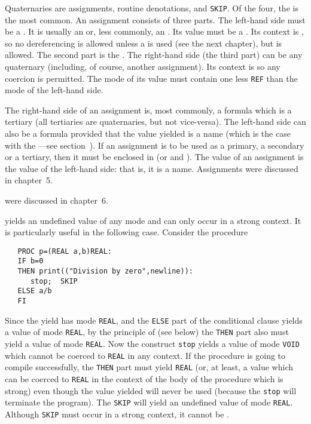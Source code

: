 Quaternaries are assignments, routine denotations,
 and \verb|SKIP|. Of the
four, the  is the most common.  An assignment consists
of three parts. The left-hand side must be a . It is
usually an  or, less commonly, an
. Its value must be a .
Its context is , so no dereferencing is
allowed unless a  is used (see the next chapter), but
 is allowed.  The second
part is the .  The right-hand side (the third
part) can be any quaternary (including, of course, another
assignment). Its context is  so any
coercion is permitted.  The mode of its value must contain one less
\verb|REF| than the mode of the left-hand side.

The right-hand side of an assignment is, most commonly, a formula
which is a tertiary (all tertiaries are quaternaries, but not
vice-versa).  The left-hand side can also be a formula provided that
the value yielded is a name (which is the case with the ---see section~). If an assignment is to
be used as a primary, a secondary or a tertiary, then it must be
enclosed in (or  and ).  The
value of an assignment is the value of the left-hand side: that is,
it is a name.  Assignments were discussed in chapter~5.

 were discussed in
chapter~6.

 yields an undefined value of any mode
and can only occur in a strong context. It is particularly useful in
the following case. Consider the procedure
\begin{verbatim}
   PROC p=(REAL a,b)REAL:
   IF b=0
   THEN print(("Division by zero",newline)):
      stop;  SKIP
   ELSE a/b
   FI
\end{verbatim}
\noindent
Since the yield has mode \verb|REAL|, and the \verb|ELSE| part of the
conditional clause yields a value of mode \verb|REAL|, by the principle
of  (see below) the \verb|THEN| part also
must yield a value of mode \verb|REAL|.  Now the construct \verb|stop|
yields a value of mode \verb|VOID| which cannot be coerced to
\verb|REAL| in any context.  If the procedure is going to compile
successfully, the \verb|THEN| part must yield \verb|REAL| (or, at
least, a value which can be coerced to \verb|REAL| in the context of
the body of the procedure which is strong) even though the value
yielded will never be used (because the \verb|stop| will terminate the
program).  The \verb|SKIP| will yield an undefined value of mode
\verb|REAL|.  Although \verb|SKIP| must occur in a strong context, it
cannot be .

